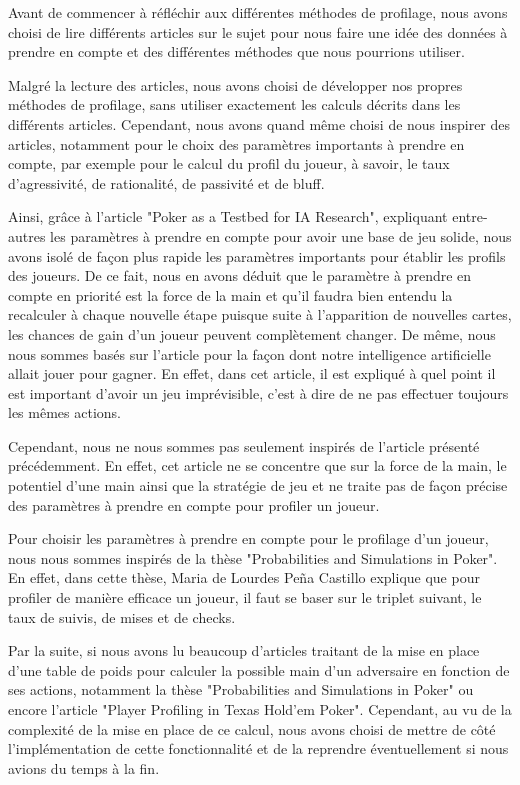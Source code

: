 \documentclass{report}
\begin{document}
\hspace{0.5cm}Avant de commencer à réfléchir aux différentes méthodes de profilage, nous avons choisi de lire différents articles sur le sujet pour nous faire une idée des données à prendre en compte et des différentes méthodes que nous pourrions utiliser. \par
Malgré la lecture des articles, nous avons choisi de développer nos propres méthodes de profilage, sans utiliser exactement les calculs décrits dans les différents articles. Cependant, nous avons quand même choisi de nous inspirer des articles, notamment pour le choix des paramètres importants à prendre en compte, par exemple pour le calcul du profil du joueur, à savoir, le taux d'agressivité, de rationalité, de passivité et de bluff. \par
Ainsi, grâce à l'article "Poker as a Testbed for IA Research", expliquant entre-autres les paramètres à prendre en compte pour avoir une base de jeu solide, nous avons isolé de façon plus rapide les paramètres importants pour établir les profils des joueurs. De ce fait, nous en avons déduit que le paramètre à prendre en compte en priorité est la force de la main et qu'il faudra bien entendu la recalculer à chaque nouvelle étape puisque suite à l'apparition de nouvelles cartes, les chances de gain d'un joueur peuvent complètement changer. De même, nous nous sommes basés sur l'article pour la façon dont notre intelligence artificielle allait jouer pour gagner. En effet, dans cet article, il est expliqué à quel point il est important d'avoir un jeu imprévisible, c'est à dire de ne pas effectuer toujours les mêmes actions. \par
Cependant, nous ne nous sommes pas seulement inspirés de l'article présenté précédemment. En effet, cet article ne se concentre que sur la force de la main, le potentiel d'une main ainsi que la stratégie de jeu et ne traite pas de façon précise des paramètres à prendre en compte pour profiler un joueur. \par
Pour choisir les paramètres à prendre en compte pour le profilage d'un joueur, nous nous sommes inspirés de la thèse "Probabilities and Simulations in Poker". En effet, dans cette thèse, Maria de Lourdes Peña Castillo explique que pour profiler de manière efficace un joueur, il faut se baser sur le triplet suivant, le taux de suivis, de mises et de checks. \par

Par la suite, si nous avons lu beaucoup d'articles traitant de la mise en place d'une table de poids pour calculer la possible main d'un adversaire en fonction de ses actions, notamment la thèse "Probabilities and Simulations in Poker" ou encore l'article "Player Profiling in Texas Hold'em Poker". Cependant, au vu de la complexité de la mise en place de ce calcul, nous avons choisi de mettre de côté l'implémentation de cette fonctionnalité et de la reprendre éventuellement si nous avions du temps à la fin. \par
\end{document}
